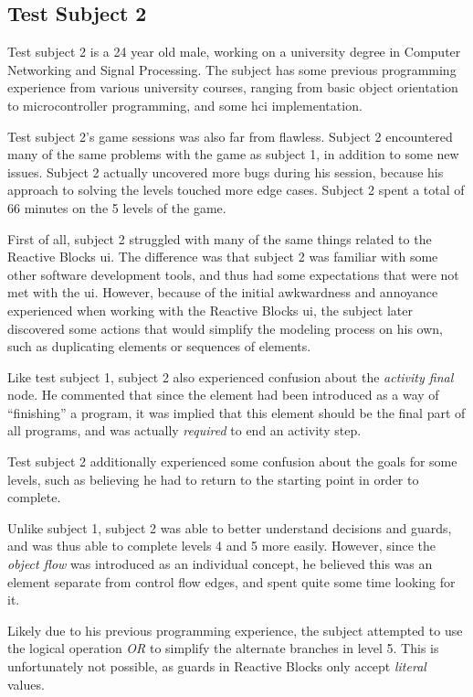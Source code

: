 \subsection{Test Subject 2}
\label{sec:game_testing_subject2}
Test subject 2 is a 24 year old male, working on a university degree in Computer Networking and Signal Processing. The subject has some previous programming experience from various university courses, ranging from basic object orientation to microcontroller programming, and some \gls{hci} implementation.

\noindent
Test subject 2's game sessions was also far from flawless. Subject 2 encountered many of the same problems with the game as subject 1, in addition to some new issues. Subject 2 actually uncovered more bugs during his session, because his approach to solving the levels touched more edge cases. Subject 2 spent a total of 66 minutes on the 5 levels of the game.

\noindent
First of all, subject 2 struggled with many of the same things related to the Reactive Blocks \gls{ui}. The difference was that subject 2 was familiar with some other software development tools, and thus had some expectations that were not met with the \gls{ui}. However, because of the initial awkwardness and annoyance experienced when working with the Reactive Blocks \gls{ui}, the subject later discovered some actions that would simplify the modeling process on his own, such as duplicating elements or sequences of elements.

\noindent
Like test subject 1, subject 2 also experienced confusion about the \emph{activity final} node. He commented that since the element had been introduced as a way of ``finishing'' a program, it was implied that this element should be the final part of all programs, and was actually \emph{required} to end an activity step.

\noindent
Test subject 2 additionally experienced some confusion about the goals for some levels, such as believing he had to return to the starting point in order to complete.

\noindent
Unlike subject 1, subject 2 was able to better understand decisions and guards, and was thus able to complete levels 4 and 5 more easily. However, since the \emph{object flow} was introduced as an individual concept, he believed this was an element separate from control flow edges, and spent quite some time looking for it.

\noindent
Likely due to his previous programming experience, the subject attempted to use the logical operation \emph{OR} to simplify the alternate branches in level 5. This is unfortunately not possible, as guards in Reactive Blocks only accept \emph{literal} values.

